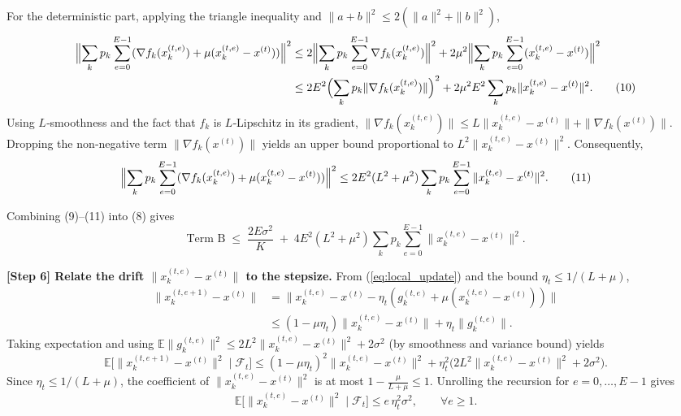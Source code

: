 \documentclass{article}
\newcommand{\E}{\mathbb{E}}
\begin{document}
For the deterministic part, applying the triangle inequality and $\|a+b\|^2\le2(\|a\|^2+\|b\|^2)$,
\begin{align}
\Bigl\|\sum_{k}p_k\sum_{e=0}^{E-1}
      (\nabla f_k(x_{k}^{(t,e)})+\mu(x_{k}^{(t,e)}-x^{(t)}))\Bigr\|^{2}
&\le 2\Bigl\|\sum_{k}p_k\sum_{e=0}^{E-1}\nabla f_k(x_{k}^{(t,e)})\Bigr\|^{2}
   +2\mu^{2}\Bigl\|\sum_{k}p_k\sum_{e=0}^{E-1}(x_{k}^{(t,e)}-x^{(t)})\Bigr\|^{2} \nonumber\\
&\le 2E^{2}\Bigl(\sum_{k}p_k\|\nabla f_k(x_{k}^{(t,e)})\|\Bigr)^{2}
   +2\mu^{2}E^{2}\sum_{k}p_k\|x_{k}^{(t,e)}-x^{(t)}\|^{2}. \tag{10}
\end{align}
Using $L$‑smoothness and the fact that $f_k$ is $L$‑Lipschitz in its gradient,
$\|\nabla f_k(x_{k}^{(t,e)})\|\le L\|x_{k}^{(t,e)}-x^{(t)}\|+\|\nabla f_k(x^{(t)})\|$.
Dropping the non‑negative term $\|\nabla f_k(x^{(t)})\|$ yields an upper bound
proportional to $L^{2}\|x_{k}^{(t,e)}-x^{(t)}\|^{2}$. Consequently,
\[
\Bigl\|\sum_{k}p_k\sum_{e=0}^{E-1}
      (\nabla f_k(x_{k}^{(t,e)})+\mu(x_{k}^{(t,e)}-x^{(t)}))\Bigr\|^{2}
\le 2E^{2}(L^{2}+\mu^{2})\sum_{k}p_k\sum_{e=0}^{E-1}\|x_{k}^{(t,e)}-x^{(t)}\|^{2}.
\tag{11}
\]

Combining (9)–(11) into (8) gives
\[
\text{Term B}\;\le\;
\frac{2E\sigma^{2}}{K}
\;+\;4E^{2}(L^{2}+\mu^{2})\sum_{k}p_k\sum_{e=0}^{E-1}\|x_{k}^{(t,e)}-x^{(t)}\|^{2}.
\tag{12}
\]

\medskip
\noindent\textbf{[Step 6] Relate the drift $\|x_{k}^{(t,e)}-x^{(t)}\|$ to the stepsize.}  
From (\ref{eq:local_update}) and the bound $\eta_t\le 1/(L+\mu)$,
\begin{align}
\|x_{k}^{(t,e+1)}-x^{(t)}\|
&= \bigl\|x_{k}^{(t,e)}-x^{(t)} -\eta_t(g_{k}^{(t,e)}+\mu(x_{k}^{(t,e)}-x^{(t)}))\bigr\| \nonumber\\
&\le (1-\mu\eta_t)\|x_{k}^{(t,e)}-x^{(t)}\| + \eta_t\|g_{k}^{(t,e)}\| .
\end{align}
Taking expectation and using $\E\|g_{k}^{(t,e)}\|^{2}\le 2L^{2}\|x_{k}^{(t,e)}-x^{(t)}\|^{2}+2\sigma^{2}$ (by smoothness and variance bound) yields
\[
\E\bigl[\|x_{k}^{(t,e+1)}-x^{(t)}\|^{2}\mid\mathcal{F}_t\bigr]
\le (1-\mu\eta_t)^{2}\|x_{k}^{(t,e)}-x^{(t)}\|^{2}
      +\eta_t^{2}\bigl(2L^{2}\|x_{k}^{(t,e)}-x^{(t)}\|^{2}+2\sigma^{2}\bigr).
\]
Since $\eta_t\le 1/(L+\mu)$, the coefficient of $\|x_{k}^{(t,e)}-x^{(t)}\|^{2}$ is at most
$1-\frac{\mu}{L+\mu}\le 1$. Unrolling the recursion for $e=0,\dots,E-1$ gives
\[
\E\bigl[\|x_{k}^{(t,e)}-x^{(t)}\|^{2}\mid\mathcal{F}_t\bigr]
\le e\,\eta_t^{2}\sigma^{2},\qquad\forall e\ge1 .
\tag{13}
\]
\end{document}
